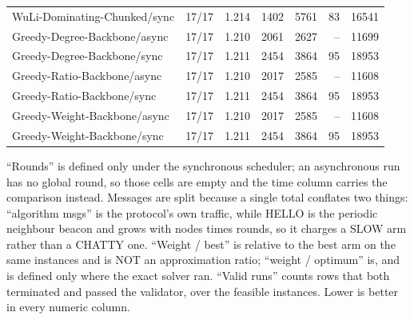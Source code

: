 \begin{table}[tb]
\begin{tabular}{lrrrrrr}
WuLi-Dominating-Chunked/sync & 17/17 & 1.214 & 1402 & 5761 & 83 & 16541 \\
Greedy-Degree-Backbone/async & 17/17 & 1.210 & 2061 & 2627 & -- & 11699 \\
Greedy-Degree-Backbone/sync & 17/17 & 1.211 & 2454 & 3864 & 95 & 18953 \\
Greedy-Ratio-Backbone/async & 17/17 & 1.210 & 2017 & 2585 & -- & 11608 \\
Greedy-Ratio-Backbone/sync & 17/17 & 1.211 & 2454 & 3864 & 95 & 18953 \\
Greedy-Weight-Backbone/async & 17/17 & 1.210 & 2017 & 2585 & -- & 11608 \\
Greedy-Weight-Backbone/sync & 17/17 & 1.211 & 2454 & 3864 & 95 & 18953 \\
\bottomrule
\end{tabular}
\begin{flushleft}\footnotesize
``Rounds'' is defined only under the synchronous scheduler; an asynchronous run has no global round, so those cells are empty and the time column carries the comparison instead. Messages are split because a single total conflates two things: ``algorithm msgs'' is the protocol's own traffic, while HELLO is the periodic neighbour beacon and grows with nodes times rounds, so it charges a SLOW arm rather than a CHATTY one. ``Weight / best'' is relative to the best arm on the same instances and is NOT an approximation ratio; ``weight / optimum'' is, and is defined only where the exact solver ran. ``Valid runs'' counts rows that both terminated and passed the validator, over the feasible instances. Lower is better in every numeric column.
\end{flushleft}
\end{table}
